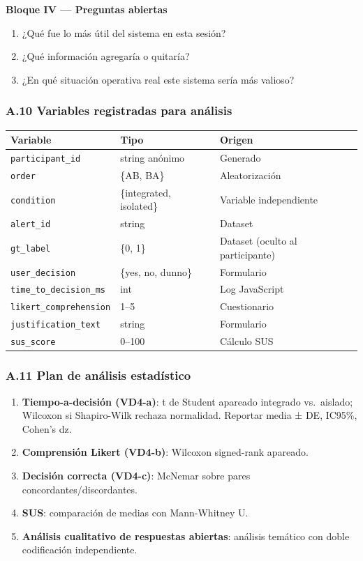\textbf{Bloque IV --- Preguntas abiertas}

\begin{enumerate}
\def\labelenumi{\arabic{enumi}.}
\tightlist
\item
  ¿Qué fue lo más útil del sistema en esta sesión?
\item
  ¿Qué información agregaría o quitaría?
\item
  ¿En qué situación operativa real este sistema sería más valioso?
\end{enumerate}

\subsubsection{A.10 Variables registradas para
análisis}\label{a.10-variables-registradas-para-anuxe1lisis}

\begin{longtable}[]{@{}lll@{}}
\toprule\noalign{}
Variable & Tipo & Origen \\
\midrule\noalign{}
\endhead
\bottomrule\noalign{}
\endlastfoot
\texttt{participant\_id} & string anónimo & Generado \\
\texttt{order} & \{AB, BA\} & Aleatorización \\
\texttt{condition} & \{integrated, isolated\} & Variable
independiente \\
\texttt{alert\_id} & string & Dataset \\
\texttt{gt\_label} & \{0, 1\} & Dataset (oculto al participante) \\
\texttt{user\_decision} & \{yes, no, dunno\} & Formulario \\
\texttt{time\_to\_decision\_ms} & int & Log JavaScript \\
\texttt{likert\_comprehension} & 1--5 & Cuestionario \\
\texttt{justification\_text} & string & Formulario \\
\texttt{sus\_score} & 0--100 & Cálculo SUS \\
\end{longtable}

\subsubsection{A.11 Plan de análisis
estadístico}\label{a.11-plan-de-anuxe1lisis-estaduxedstico}

\begin{enumerate}
\def\labelenumi{\arabic{enumi}.}
\tightlist
\item
  \textbf{Tiempo-a-decisión (VD4-a)}: t de Student apareado integrado
  vs.~aislado; Wilcoxon si Shapiro-Wilk rechaza normalidad. Reportar
  media ± DE, IC95\%, Cohen's dz.
\item
  \textbf{Comprensión Likert (VD4-b)}: Wilcoxon signed-rank apareado.
\item
  \textbf{Decisión correcta (VD4-c)}: McNemar sobre pares
  concordantes/discordantes.
\item
  \textbf{SUS}: comparación de medias con Mann-Whitney U.
\item
  \textbf{Análisis cualitativo de respuestas abiertas}: análisis
  temático con doble codificación independiente.
\end{enumerate}

